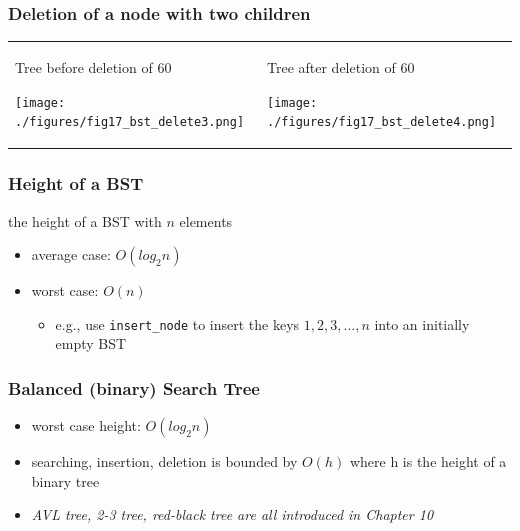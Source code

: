 \documentclass[newPxFont,sthlmFooter,nooffset]{beamer}
\begin{document}
\begin{frame}[t]
  \frametitle{Deletion of a node with two children}
  \begin{tabular}{p{} p{}}
Tree before deletion of 60

    \texttt{[image: ./figures/fig17\_bst\_delete3.png]}
&
Tree after deletion of 60

    \texttt{[image: ./figures/fig17\_bst\_delete4.png]}
\\
  \end{tabular}
\end{frame}


\begin{frame}[t]
  \frametitle{Height of a BST}
the height of a BST with $n$ elements 
\begin{itemize}
\item average case: $O(log_2n)$
\item worst case: $O(n)$
  \begin{itemize}
  \item e.g., use \texttt{insert\_node} to insert the keys $1, 2, 3, \ldots, n$ into an
    initially empty BST
  \end{itemize}

\end{itemize}

\end{frame}


\begin{frame}[t]
  \frametitle{Balanced (binary) Search Tree}
  \begin{itemize}
  \item worst case height: $O(log_2n)$
  \item searching, insertion, deletion is bounded by $O(h)$ where h is
    the height of a binary tree
  \item \textit{AVL tree, 2-3 tree, red-black tree
    are all introduced in Chapter 10}
  \end{itemize}
\end{frame}
\end{document}
